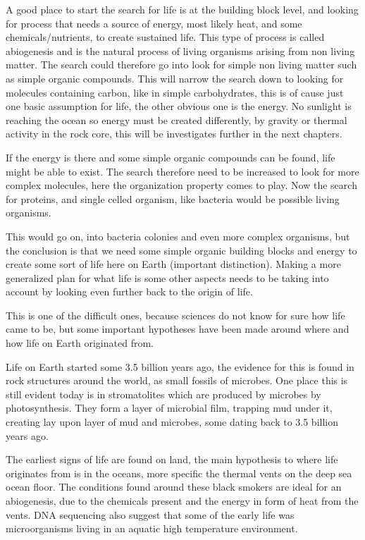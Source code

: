A good place to start the search for life is at the building block level, and looking for process that needs a source of energy, most likely heat, and some chemicals/nutrients, to create sustained life. This type of process is called abiogenesis\cite{Abiogenesis} and is the natural process of living organisms arising from non living matter. The search could therefore go into look for simple non living matter such as simple organic compounds. This will narrow the search down to looking for molecules containing carbon, like in simple carbohydrates, this is of cause just one basic assumption for life, the other obvious one is the energy. No sunlight is reaching the ocean so energy must be created differently, by gravity or thermal activity in the rock core, this will be investigates further in the next chapters.

If the energy is there and some simple organic compounds can be found, life might be able to exist. The search therefore need to be increased to look for more complex molecules, here the organization property comes to play.  Now the search for proteins, and single celled organism, like bacteria would be possible living organisms.

This would go on, into bacteria colonies and even more complex organisms, but the conclusion is that we need some simple organic building blocks and energy to create some sort of life here on Earth (important distinction). Making a more generalized plan for what life is some other aspects needs to be taking into account by looking even further back to the origin of life.


This is one of the difficult ones, because sciences do not know for sure how life came to be, but some important hypotheses have been made around where and how life on Earth originated from.

Life on Earth started some 3.5 billion years ago, the evidence for this is found in rock structures around the world, as small fossils of microbes. One place this is still evident today is in stromatolites which are produced by microbes by photosynthesis. They form a layer of microbial film, trapping mud under it, creating lay upon layer of mud and microbes, some dating back to 3.5 billion years ago.

The earliest signs of life are found on land, the main hypothesis to where life originates from is in the oceans, more specific the thermal vents on the deep sea ocean floor. The conditions found around these black smokers are ideal for an abiogenesis, due to the chemicals present and the energy in form of heat from the vents. DNA sequencing also suggest that some of the early life was microorganisms living in an aquatic high temperature environment.

